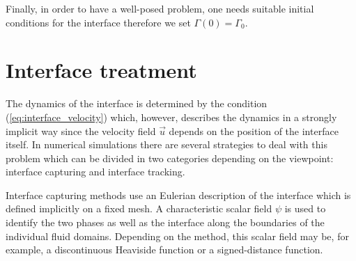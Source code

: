 Finally, in order to have a well-posed problem, one needs suitable initial
conditions for the interface therefore we set $\Gamma(0)=\Gamma_0$.

\section[Interface treatment]{Interface treatment}
The dynamics of the interface is determined by the condition
(\ref{eq:interface_velocity}) which, however, describes the dynamics in a
strongly implicit way since the velocity field $\vec u$ depends on the
position of the interface itself. In numerical simulations there are
several strategies to deal with this problem which can be divided in two
categories depending on the viewpoint: interface capturing and interface
tracking.

Interface capturing methods use an Eulerian description of the interface which
is defined implicitly on a fixed mesh. A characteristic scalar field $\psi$
is used to identify the two phases as well as the interface along the boundaries
of the individual fluid domains. Depending on the method, this scalar field may
be, for example, a discontinuous Heaviside function or a signed-distance
function.
